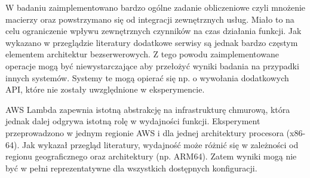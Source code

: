 W badaniu zaimplementowano bardzo ogólne zadanie obliczeniowe czyli mnożenie macierzy oraz powstrzymano się od integracji zewnętrznych usług.
Miało to na celu ograniczenie wpływu zewnętrznych czynników na czas działania funkcji.
Jak wykazano w przeglądzie literatury dodatkowe serwisy są jednak bardzo częstym elementem architektur bezserwerowych.
Z tego powodu zaimplementowane operacje mogą być niewystarczające aby przełożyć wyniki badania na przypadki innych systemów.
Systemy te mogą opierać się np. o wywołania dodatkowych API, które nie zostały uwzględnione w eksperymencie.

AWS Lambda zapewnia istotną abstrakcję na infrastrukturę chmurową, która jednak dalej odgrywa istotną rolę w wydajności funkcji.
Eksperyment przeprowadzono w jednym regionie AWS i dla jednej architektury procesora (x86-64). 
Jak wykazał przegląd literatury, wydajność może różnić się w zależności od regionu geograficznego oraz architektury (np. ARM64). 
Zatem wyniki mogą nie być w pełni reprezentatywne dla wszystkich dostępnych konfiguracji.
